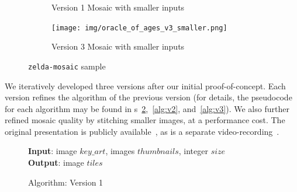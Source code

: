 \documentclass[11pt,conference]{IEEEtran}
\theoremstyle{plain} %
\theoremstyle{definition}
\theoremstyle{remark}
\begin{document}
\begin{figure}[pht]
\begin{subfigure}{0.35\textwidth}
        \caption{Version 1 Mosaic with smaller inputs}
    \end{subfigure}
    \begin{subfigure}{0.35\textwidth}
        \texttt{[image: img/oracle\_of\_ages\_v3\_smaller.png]}
        \caption{Version 3 Mosaic with smaller inputs}
    \end{subfigure}
    \caption{\texttt{zelda-mosaic} sample}\label{F:zelda-mosaic-sample}
\end{figure}

We iteratively developed three versions after our initial proof-of-concept. Each
version refines the algorithm of the previous version (for details, the
pseudocode for each algorithm may be found in
\figurename{s}~\ref{alg:v1},~\ref{alg:v2}, and~\ref{alg:v3}). We also further
refined mosaic quality by stitching smaller images, at a performance cost. The
original presentation is publicly available~\cite{zelda_mosaic_pres}, as is a
separate video-recording~\cite{zelda_mosaic_vid}.

\begin{figure}[htp]
    \textbf{Input}: image \(key\_art\), images \(thumbnails\), integer \(size\) \\
    \textbf{Output}: image \(tiles\)
    \begin{algorithmic}
            \ENDFOR
        \ENDFOR
    \end{algorithmic}
    \caption{Algorithm: Version 1}\label{alg:v1}
\end{figure}
\end{document}

